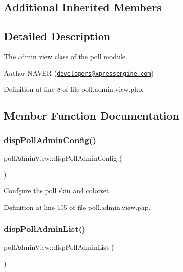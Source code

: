 \subsection*{Additional Inherited Members}


\subsection{Detailed Description}
The admin view class of the poll module. 

\begin{DoxyAuthor}{Author}
N\+A\+V\+ER (\href{mailto:developers@xpressengine.com}{\tt developers@xpressengine.\+com}) 
\end{DoxyAuthor}


Definition at line 8 of file poll.\+admin.\+view.\+php.



\subsection{Member Function Documentation}
\hypertarget{classpollAdminView_a187abafd38bcaa2b0f72b4f08e667be8}{}\label{classpollAdminView_a187abafd38bcaa2b0f72b4f08e667be8} 
\subsubsection{\texorpdfstring{disp\+Poll\+Admin\+Config()}{dispPollAdminConfig()}}
{\footnotesize\ttfamily poll\+Admin\+View\+::disp\+Poll\+Admin\+Config (\begin{DoxyParamCaption}{ }\end{DoxyParamCaption})}



Confgure the poll skin and colorset. 



Definition at line 105 of file poll.\+admin.\+view.\+php.

\hypertarget{classpollAdminView_a6c6fb22f667d20327d6770a3227c2875}{}\label{classpollAdminView_a6c6fb22f667d20327d6770a3227c2875} 
\subsubsection{\texorpdfstring{disp\+Poll\+Admin\+List()}{dispPollAdminList()}}
{\footnotesize\ttfamily poll\+Admin\+View\+::disp\+Poll\+Admin\+List (\begin{DoxyParamCaption}{ }\end{DoxyParamCaption})}




